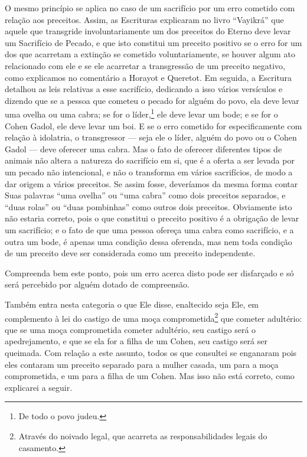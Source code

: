 O mesmo princípio se aplica no caso de um sacrifício por um erro
cometido com relação aos preceitos. Assim, as Escrituras explicaram no
livro ``Vayikrá'' que aquele que transgride involuntariamente um dos
preceitos do Eterno deve levar um Sacrifício de Pecado, e que isto
constitui um preceito positivo se o erro for um dos que acarretam a
extinção se cometido voluntariamente, se houver algum ato relacionado
com ele e se ele acarretar a transgressão de um preceito negativo, como
explicamos no comentário a Horayot e Queretot. Em seguida, a Escritura
detalhou as leis relativas a esse sacrifício, dedicando a isso vários
versículos e dizendo que se a pessoa que cometeu o pecado for alguém do
povo, ela deve levar uma ovelha ou uma cabra; se for o
líder,\footnote{De todo o povo judeu.} ele deve levar um bode; e se for o Cohen
Gadol, ele deve levar um boi. E se o erro cometido for especificamente
com relação à idolatria, o transgressor --- seja ele o líder, alguém do
povo ou o Cohen Gadol --- deve oferecer uma cabra. Mas o fato de
oferecer diferentes tipos de animais não altera a natureza do sacrifício
em si, que é a oferta a ser levada por um pecado não intencional, e não
o transforma em vários sacrifícios, de modo a dar origem a vários
preceitos. Se assim fosse, deveríamos da mesma forma contar Suas
palavras ``uma ovelha'' ou ``uma cabra'' como dois preceitos separados,
e ``duas rolas'' ou ``duas pombinhas'' como outros dois preceitos.
Obviamente isto não estaria correto, pois o que constitui o preceito
positivo é a obrigação de levar um sacrifício; e o fato de que uma
pessoa ofereça uma cabra como sacrifício, e a outra um bode, é apenas
uma condição dessa oferenda, mas nem toda condição de um preceito deve
ser considerada como um preceito independente.

Compreenda bem este ponto, pois um erro acerca disto pode ser disfarçado
e só será percebido por alguém dotado de compreensão.

Também entra nesta categoria o que Ele disse, enaltecido seja Ele,
em complemento à lei do castigo de uma moça
comprometida\footnote{Através do noivado legal, que acarreta as responsabilidades legais
do casamento.} que cometer adultério: que se uma moça
comprometida cometer adultério, seu castigo será
o apedrejamento, e que se ela for a filha de um Cohen, seu castigo
será ser
queimada. Com relação a este assunto, todos os que consultei se
enganaram pois eles contaram um preceito separado para a mulher casada,
um para a moça comprometida, e um para a filha de um Cohen. Mas isso
não está correto, como explicarei a seguir.

